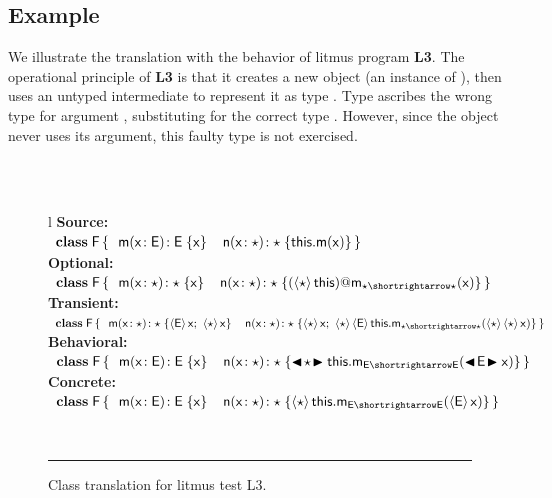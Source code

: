 \documentclass[USenglish]{tex/lipics-v2016}f
\begin{document}
\subsection{Example}

We illustrate the translation with the behavior of litmus program {\bf L3}.
The operational principle of {\bf L3} is that it creates a new object (an
instance of \C), then uses an untyped intermediate to represent it as type \E. Type
\E ascribes the wrong type for argument \x, substituting \D for the correct
type \C. However, since the object never uses its argument, this faulty type
is not exercised.

\begin{figure}[!h]\small
\hrulefill\\
\\
\begin{tabular}{l}
{\bf Source:} \\[2mm]
\(
\begin{array}{l@{\,}l}
\Class{\xt F}{}{&\Mdef\m\x{\xt E}{\xt E}\x \HS\HS
    \Mdef\n\x\any\any{\Call\this\m\x}} \\
\end{array}
\) \\[2mm]
{\bf Optional:}\\[2mm]
\(
\begin{array}{l@{\,}l}
\Class{\xt F}{}{&\Mdef\m\x{\any}{\any}\x  \HS\HS
    \Mdef\n\x\any\any{\DynCall{(\SubCast\any\this)}\m\x}} 
\end{array}
\) \\[2mm]
{\bf Transient:}\\[2mm]
\(
\begin{array}{l@{\,}l}
\Class{\xt F}{}{
   &\Mdef\m\x\any\any{\SubCast{\xt E}{\x}; ~ \SubCast{\any}{\x} } 
    \HS\HS \Mdef\n\x\any\any{\SubCast{\any}{\x}\sspce 
   \SubCast{\any}{\SubCast{\xt E}{\KCall\this\m{\SubCast\any{\SubCast\any\x}}\any\any}}}} 
\end{array}
\)\\[2mm]
{\bf Behavioral:} \\[2mm]
\(
\begin{array}{l@{\,}l}
\Class{\xt F}{}{&\Mdef\m\x{\xt E}{\xt E}\x \HS\HS
      \Mdef\n\x\any\any{\BehCast\any{\KCall\this\m{\BehCast{\xt E}\x}{\xt E}{\xt E}}}} 
\end{array}
\) \\[2mm]
{\bf Concrete:} \\[2mm]
\(
\begin{array}{l@{\,}l}
\Class{\xt F}{}{&\Mdef\m\x{\xt E}{\xt E}\x  \HS\HS
       \Mdef\n\x\any\any{\SubCast\any{\KCall\this\m{\SubCast{\xt E}\x}{\xt E}{\xt E}}}} 
\end{array}
\) \\
\end{tabular}\vspace{2mm}\\
\hrule\vspace{4mm}

 \caption{Class translation for litmus test L3.} \label{fig:l3trans}
\end{figure}
\end{document}
